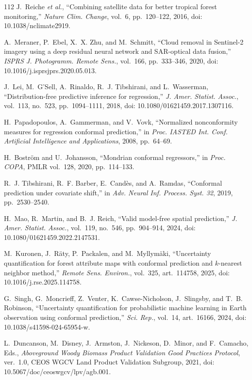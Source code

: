 \documentclass[conference,a4paper]{IEEEtran}
\begin{document}
\begin{thebibliography}{112}
J.~Reiche \textit{et al.}, ``Combining satellite data for better tropical forest monitoring,'' \textit{Nature Clim. Change}, vol.~6, pp.~120--122, 2016, doi: 10.1038/nclimate2919.

A.~Meraner, P.~Ebel, X.~X. Zhu, and M.~Schmitt, ``Cloud removal in Sentinel-2 imagery using a deep residual neural network and SAR-optical data fusion,'' \textit{ISPRS J. Photogramm. Remote Sens.}, vol.~166, pp.~333--346, 2020, doi: 10.1016/j.isprsjprs.2020.05.013.

J.~Lei, M.~G'Sell, A.~Rinaldo, R.~J. Tibshirani, and L.~Wasserman, ``Distribution-free predictive inference for regression,'' \textit{J. Amer. Statist. Assoc.}, vol.~113, no.~523, pp.~1094--1111, 2018, doi: 10.1080/01621459.2017.1307116.

H.~Papadopoulos, A.~Gammerman, and V.~Vovk, ``Normalized nonconformity measures for regression conformal prediction,'' in \textit{Proc. IASTED Int. Conf. Artificial Intelligence and Applications}, 2008, pp.~64--69.

H.~Bostr\"om and U.~Johansson, ``Mondrian conformal regressors,'' in \textit{Proc. COPA}, PMLR vol.~128, 2020, pp.~114--133.

R.~J. Tibshirani, R.~F. Barber, E.~Cand\`es, and A.~Ramdas, ``Conformal prediction under covariate shift,'' in \textit{Adv. Neural Inf. Process. Syst. 32}, 2019, pp.~2530--2540.

H.~Mao, R.~Martin, and B.~J. Reich, ``Valid model-free spatial prediction,'' \textit{J. Amer. Statist. Assoc.}, vol.~119, no.~546, pp.~904--914, 2024, doi: 10.1080/01621459.2022.2147531.

M.~Kuronen, J.~R\"aty, P.~Packalen, and M.~Myllym\"aki, ``Uncertainty quantification for forest attribute maps with conformal prediction and $k$-nearest neighbor method,'' \textit{Remote Sens. Environ.}, vol.~325, art.~114758, 2025, doi: 10.1016/j.rse.2025.114758.

G.~Singh, G.~Moncrieff, Z.~Venter, K.~Cawse-Nicholson, J.~Slingsby, and T.~B. Robinson, ``Uncertainty quantification for probabilistic machine learning in Earth observation using conformal prediction,'' \textit{Sci. Rep.}, vol.~14, art.~16166, 2024, doi: 10.1038/s41598-024-65954-w.

L.~Duncanson, M.~Disney, J.~Armston, J.~Nickeson, D.~Minor, and F.~Camacho, Eds., \textit{Aboveground Woody Biomass Product Validation Good Practices Protocol}, ver.~1.0, CEOS WGCV Land Product Validation Subgroup, 2021, doi: 10.5067/doc/ceoswgcv/lpv/agb.001.


\end{thebibliography}
\end{document}
